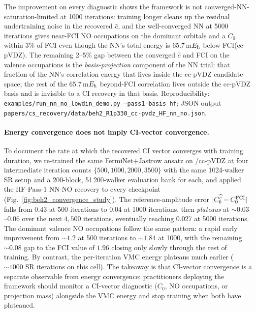 \documentclass[journal=jctcce,manuscript=suppinfo,layout=traditional]{achemso}
\begin{document}
\noindent The improvement on every diagnostic shows the framework is
not converged-NN-saturation-limited at 1000 iterations: training
longer cleans up the residual undertraining noise in the recovered
$\widehat c$, and the well-converged NN at 5000 iterations gives
near-FCI NO occupations on the dominant orbitals and a $C_0$ within
3\% of FCI even though the NN's total energy is 65.7\,m$E_{\rm h}$
below FCI(cc-pVDZ). The remaining 2--5\% gap between the converged
$\widehat c$ and FCI on the valence occupations is the
\emph{basis-projection} component of the NN trial: that fraction of
the NN's correlation energy that lives inside the cc-pVDZ
candidate space; the rest of the 65.7\,m$E_{\rm h}$ beyond-FCI
correlation lives outside the cc-pVDZ basis and is invisible to a
CI recovery in that basis. Reproducibility:
\texttt{examples/run\_nn\_no\_lowdin\_demo.py --pass1-basis hf};
JSON output \texttt{papers/cs\_recovery/data/beh2\_R1p330\_cc-pvdz\_HF\_nn\_no.json}.

\paragraph{Energy convergence does not imply CI-vector convergence.}
To document the rate at which the recovered CI vector converges with
training duration, we re-trained the same FermiNet+Jastrow ansatz on
/cc-pVDZ at four intermediate iteration counts
$\{500, 1000, 2000, 3500\}$ with the same 1024-walker SR setup and a
200-block, 51\,200-walker evaluation bank for each, and applied the
HF-Pass-1 NN-NO recovery to every checkpoint
(Fig.~\ref{fig:beh2_convergence_study}). The reference-amplitude
error $|C_0^{\widehat c} - C_0^{\rm FCI}|$ falls from $0.43$ at 500
iterations to $0.04$ at 1000 iterations, then \emph{plateaus} at
$\sim 0.03$--$0.06$ over the next $4{,}500$ iterations, eventually
reaching $0.027$ at 5000 iterations. The dominant valence NO
occupations follow the same pattern: a rapid early improvement from
$\sim 1.2$ at 500 iterations to $\sim 1.84$ at 1000, with the
remaining $\sim 0.08$ gap to the FCI value of $1.96$ closing only
slowly through the rest of training. By contrast, the per-iteration
VMC energy plateaus much earlier ($\sim 1000$ SR iterations on this
cell). The takeaway is that CI-vector convergence is a separate
observable from energy convergence: practitioners deploying the
framework should monitor a CI-vector diagnostic ($C_0$, NO
occupations, or projection mass) alongside the VMC energy and stop
training when both have plateaued.
\end{document}
